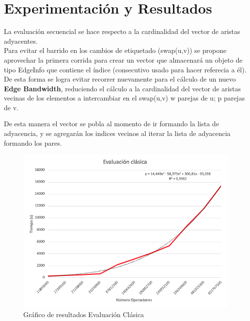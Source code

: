 \documentclass[oneside,onecolumn]{article}
\begin{document}
\section{Experimentación y Resultados}

La evaluación secuencial se hace respecto a la cardinalidad del vector de aristas adyacentes.\\

Para evitar el barrido en los cambios de etiquetado (swap(u,v)) se propone aprovechar la primera corrida para crear un vector que almacenará un objeto de tipo EdgeInfo que contiene el índice (consecutivo usado para hacer referecia a él). De esta forma se logra evitar recorrer nuevamente para el cálculo de un nuevo \textbf{Edge Bandwidth}, reduciendo el cálculo a la cardinalidad del vector de aristas vecinas de los elementos a intercambiar en el swap(u,v) w parejas de u; p parejas de v.


De esta manera el vector se pobla al momento de ir formando la lista de adyacencia, y se agregarán los indices vecinos al iterar la lista de adyacencia formando los pares.

\newpage

\begin{figure}[h]
  \centering
  \includegraphics[scale=0.52]{graficos/eval_clasic.png}
  \caption{Gráfico de resultados Evaluación Clásica}
\end{figure}
\end{document}
